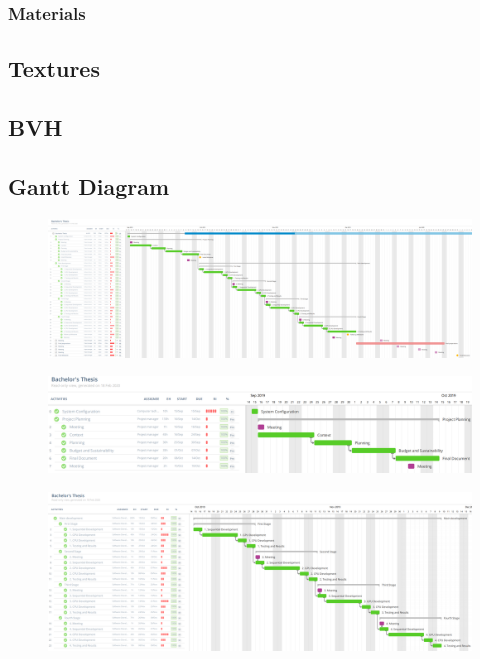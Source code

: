 \documentclass[titlepage,12pt]{report}
\begin{document}
\subsection{Materials}

\section{Textures}

\section{BVH}

\newpage

\printbibliography

\begin{appendices}
\chapter{Gantt Diagram}

\uselandscape

\begin{figure}[H]
	\centering
	\includegraphics[scale=0.30]{media/final_gantt_esp.png}
	\label{gantt_esp}
\end{figure}

\begin{figure}[H]
	\centering
  	\includegraphics[scale=0.25]{media/gantt_gep.png}
  	\label{gantt_1}
\end{figure}

\begin{figure}[H]
	\centering
  	\includegraphics[scale=0.25]{media/gantt_dev_esp.png}
  	\label{gantt_2}
\end{figure}


\end{appendices}
\end{document}
